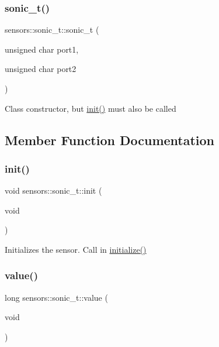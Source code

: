 \subsubsection{\texorpdfstring{sonic\+\_\+t()}{sonic\_t()}}
{\footnotesize\ttfamily sensors\+::sonic\+\_\+t\+::sonic\+\_\+t (\begin{DoxyParamCaption}\item[{unsigned char}]{port1,  }\item[{unsigned char}]{port2 }\end{DoxyParamCaption})}

Class constructor, but \hyperlink{structsensors_1_1sonic__t_a73cb49a56e55db64b42b5a6b604419dd}{init()} must also be called 

\subsection{Member Function Documentation}
\mbox{\label{structsensors_1_1sonic__t_a73cb49a56e55db64b42b5a6b604419dd}} 
\subsubsection{\texorpdfstring{init()}{init()}}
{\footnotesize\ttfamily void sensors\+::sonic\+\_\+t\+::init (\begin{DoxyParamCaption}\item[{void}]{ }\end{DoxyParamCaption})}

Initializes the sensor. Call in \hyperlink{main_8h_a25a40b6614565f755233080a384c35f1}{initialize()} \mbox{\label{structsensors_1_1sonic__t_ac7f36354ed56c69a46efcccf9775c3d5}} 
\subsubsection{\texorpdfstring{value()}{value()}}
{\footnotesize\ttfamily long sensors\+::sonic\+\_\+t\+::value (\begin{DoxyParamCaption}\item[{void}]{ }\end{DoxyParamCaption})}


